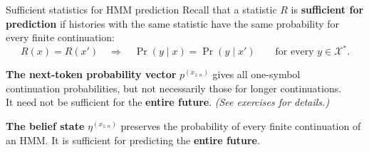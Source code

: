 \documentclass[aspectratio=169,12pt,t]{beamer}
\begin{document}
\begin{frame}{Sufficient statistics for HMM prediction}
  \setlength{\parskip}{0pt}
  \setlength{\abovedisplayskip}{4pt}
  \setlength{\belowdisplayskip}{4pt}
  Recall that a statistic $R$ is \textbf{sufficient for prediction}
  if histories with the same statistic have the same probability for every
  finite continuation:
  \[
    R(x)=R(x')
      \quad\Longrightarrow\quad
    \Pr(y\mid x)=\Pr(y\mid x')
      \qquad\text{for every }y\in\mathcal X^*.
  \]

  \vfill
  \textbf{The next-token probability vector} $p^{(x_{1:n})}$ gives all one-symbol\\
  continuation probabilities, but not necessarily those for longer continuations.\\
  It need not be sufficient for the \textbf{entire future}.
  {\small\color{iliadMuted}\emph{(See exercises for details.)}}

  \vfill
  \textbf{The belief state} $\eta^{(x_{1:n})}$ preserves the probability of
  every finite continuation of an HMM. It is sufficient for predicting the
  \textbf{entire future}.

  \vfill

\end{frame}
\end{document}
